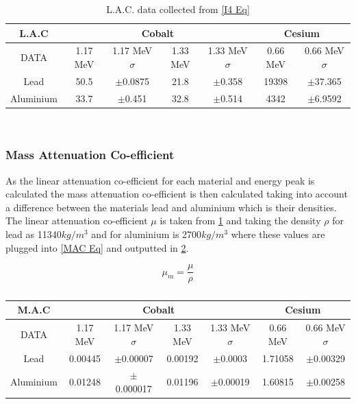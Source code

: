 \documentclass[12pt]{article}
\begin{document}
\begin{table}[H]
\begin{center}
 \footnotesize
 \begin{tabular}{|c||c|c|c|c||c|c|}
 \hline
 \multicolumn{1}{|c||}{L.A.C} & \multicolumn{4}{|c||}{Cobalt} & \multicolumn{2}{c|}{Cesium} \\
 \hline
  DATA & 1.17 MeV & 1.17 MeV $\sigma$ & 1.33 MeV & 1.33 MeV $\sigma$ & 0.66 MeV & 0.66 MeV $\sigma$\\
 \hline \hline
  Lead & 50.5 & $\pm$0.0875 & 21.8 & $\pm$0.358 & 19398 & $\pm$37.365 \\
 \hline \hline
  Aluminium & 33.7 & $\pm$0.451 & 32.8 & $\pm$0.514 & 4342 & $\pm$6.9592 \\
 \hline
 \end{tabular} \\ 
 \caption{L.A.C. data collected from \cref{I4 Eq}}
 \label{LAC Data}
\end{center}
\end{table}

\subsubsection{Mass Attenuation Co-efficient}
\label{MAC SubsubSection}

As the linear attenuation co-efficient for each material and energy peak is calculated the mass attenuation co-efficient is then calculated taking into account a difference between the materials lead and aluminium which is their densities. The linear attenuation co-efficient $\mu$ is taken from \cref{LAC Data} and taking the density $\rho$ for lead as 11340$kg/m^3$ and for aluminium is 2700$kg/m^3$ where these values are plugged into \cref{MAC Eq} and outputted in \cref{MAC Data}.

\begin{equation}
\mu_m = \dfrac{\mu}{\rho}
\label{MAC Eq}
\end{equation} 

\begin{table}[H]
\begin{center}
 \footnotesize
 \begin{tabular}{|c||c|c|c|c||c|c|}
 \hline
 \multicolumn{1}{|c||}{M.A.C} & \multicolumn{4}{|c||}{Cobalt} & \multicolumn{2}{c|}{Cesium} \\
 \hline
  DATA & 1.17 MeV & 1.17 MeV $\sigma$ & 1.33 MeV & 1.33 MeV $\sigma$ & 0.66 MeV & 0.66 MeV $\sigma$\\
 \hline \hline
  Lead & 0.00445 & $\pm$0.00007 & 0.00192 & $\pm$0.0003 & 1.71058 & $\pm$0.00329 \\
 \hline
 Aluminium & 0.01248 & $\pm$0.000017 & 0.01196 & $\pm$0.00019 & 1.60815 & $\pm$0.00258 \\
 \hline
 \end{tabular} \\ 
 \caption{}
 \label{MAC Data}
\end{center}
\end{table}
 
\end{document}
